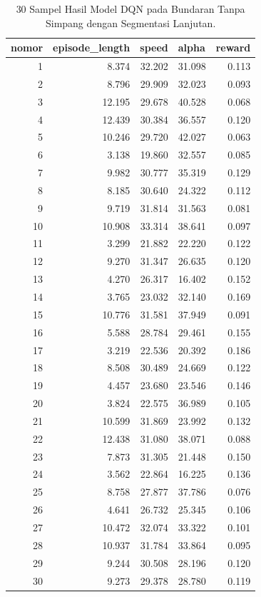 \begin{table}[H]
	\begin{tabular}{|r|r|r|r|r|}
		\hline
		\multicolumn{1}{|l|}{nomor} & \multicolumn{1}{l|}{episode\_length} & \multicolumn{1}{l|}{speed} & \multicolumn{1}{l|}{alpha} & \multicolumn{1}{l|}{reward} \\ \hline
		1  & 8.374  & 32.202 & 31.098 & 0.113 \\ \hline
		2  & 8.796  & 29.909 & 32.023 & 0.093 \\ \hline
		3  & 12.195 & 29.678 & 40.528 & 0.068 \\ \hline
		4  & 12.439 & 30.384 & 36.557 & 0.120 \\ \hline
		5  & 10.246 & 29.720 & 42.027 & 0.063 \\ \hline
		6  & 3.138  & 19.860 & 32.557 & 0.085 \\ \hline
		7  & 9.982  & 30.777 & 35.319 & 0.129 \\ \hline
		8  & 8.185  & 30.640 & 24.322 & 0.112 \\ \hline
		9  & 9.719  & 31.814 & 31.563 & 0.081 \\ \hline
		10 & 10.908 & 33.314 & 38.641 & 0.097 \\ \hline
		11 & 3.299  & 21.882 & 22.220 & 0.122 \\ \hline
		12 & 9.270  & 31.347 & 26.635 & 0.120 \\ \hline
		13 & 4.270  & 26.317 & 16.402 & 0.152 \\ \hline
		14 & 3.765  & 23.032 & 32.140 & 0.169 \\ \hline
		15 & 10.776 & 31.581 & 37.949 & 0.091 \\ \hline
		16 & 5.588  & 28.784 & 29.461 & 0.155 \\ \hline
		17 & 3.219  & 22.536 & 20.392 & 0.186 \\ \hline
		18 & 8.508  & 30.489 & 24.669 & 0.122 \\ \hline
		19 & 4.457  & 23.680 & 23.546 & 0.146 \\ \hline
		20 & 3.824  & 22.575 & 36.989 & 0.105 \\ \hline
		21 & 10.599 & 31.869 & 23.992 & 0.132 \\ \hline
		22 & 12.438 & 31.080 & 38.071 & 0.088 \\ \hline
		23 & 7.873  & 31.305 & 21.448 & 0.150 \\ \hline
		24 & 3.562  & 22.864 & 16.225 & 0.136 \\ \hline
		25 & 8.758  & 27.877 & 37.786 & 0.076 \\ \hline
		26 & 4.641  & 26.732 & 25.345 & 0.106 \\ \hline
		27 & 10.472 & 32.074 & 33.322 & 0.101 \\ \hline
		28 & 10.937 & 31.784 & 33.864 & 0.095 \\ \hline
		29 & 9.244  & 30.508 & 28.196 & 0.120 \\ \hline
		30 & 9.273  & 29.378 & 28.780 & 0.119 \\ \hline
	\end{tabular}
	\caption{30 Sampel Hasil Model DQN pada Bundaran Tanpa Simpang dengan Segmentasi Lanjutan.}
	\label{tb:hasilpengujian_notbunderan_segmented}
\end{table}

